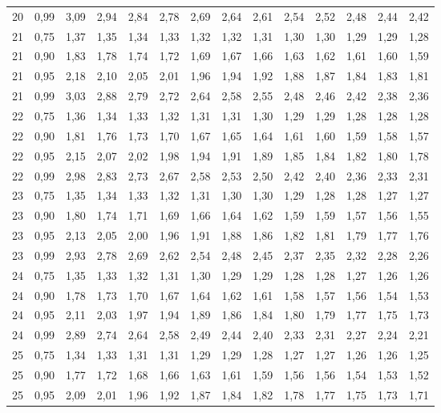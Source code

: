 \documentclass[
]{article}
\begin{document}
\begin{landscape}
\begin{longtable}[t]{cccccccccccccc}
20 & 0,99 & 3,09 & 2,94 & 2,84 & 2,78 & 2,69 & 2,64 & 2,61 & 2,54 & 2,52 & 2,48 & 2,44 & 2,42\\
21 & 0,75 & 1,37 & 1,35 & 1,34 & 1,33 & 1,32 & 1,32 & 1,31 & 1,30 & 1,30 & 1,29 & 1,29 & 1,28\\
21 & 0,90 & 1,83 & 1,78 & 1,74 & 1,72 & 1,69 & 1,67 & 1,66 & 1,63 & 1,62 & 1,61 & 1,60 & 1,59\\
21 & 0,95 & 2,18 & 2,10 & 2,05 & 2,01 & 1,96 & 1,94 & 1,92 & 1,88 & 1,87 & 1,84 & 1,83 & 1,81\\
21 & 0,99 & 3,03 & 2,88 & 2,79 & 2,72 & 2,64 & 2,58 & 2,55 & 2,48 & 2,46 & 2,42 & 2,38 & 2,36\\
22 & 0,75 & 1,36 & 1,34 & 1,33 & 1,32 & 1,31 & 1,31 & 1,30 & 1,29 & 1,29 & 1,28 & 1,28 & 1,28\\
22 & 0,90 & 1,81 & 1,76 & 1,73 & 1,70 & 1,67 & 1,65 & 1,64 & 1,61 & 1,60 & 1,59 & 1,58 & 1,57\\
22 & 0,95 & 2,15 & 2,07 & 2,02 & 1,98 & 1,94 & 1,91 & 1,89 & 1,85 & 1,84 & 1,82 & 1,80 & 1,78\\
22 & 0,99 & 2,98 & 2,83 & 2,73 & 2,67 & 2,58 & 2,53 & 2,50 & 2,42 & 2,40 & 2,36 & 2,33 & 2,31\\
23 & 0,75 & 1,35 & 1,34 & 1,33 & 1,32 & 1,31 & 1,30 & 1,30 & 1,29 & 1,28 & 1,28 & 1,27 & 1,27\\
23 & 0,90 & 1,80 & 1,74 & 1,71 & 1,69 & 1,66 & 1,64 & 1,62 & 1,59 & 1,59 & 1,57 & 1,56 & 1,55\\
23 & 0,95 & 2,13 & 2,05 & 2,00 & 1,96 & 1,91 & 1,88 & 1,86 & 1,82 & 1,81 & 1,79 & 1,77 & 1,76\\
23 & 0,99 & 2,93 & 2,78 & 2,69 & 2,62 & 2,54 & 2,48 & 2,45 & 2,37 & 2,35 & 2,32 & 2,28 & 2,26\\
24 & 0,75 & 1,35 & 1,33 & 1,32 & 1,31 & 1,30 & 1,29 & 1,29 & 1,28 & 1,28 & 1,27 & 1,26 & 1,26\\
24 & 0,90 & 1,78 & 1,73 & 1,70 & 1,67 & 1,64 & 1,62 & 1,61 & 1,58 & 1,57 & 1,56 & 1,54 & 1,53\\
24 & 0,95 & 2,11 & 2,03 & 1,97 & 1,94 & 1,89 & 1,86 & 1,84 & 1,80 & 1,79 & 1,77 & 1,75 & 1,73\\
24 & 0,99 & 2,89 & 2,74 & 2,64 & 2,58 & 2,49 & 2,44 & 2,40 & 2,33 & 2,31 & 2,27 & 2,24 & 2,21\\
25 & 0,75 & 1,34 & 1,33 & 1,31 & 1,31 & 1,29 & 1,29 & 1,28 & 1,27 & 1,27 & 1,26 & 1,26 & 1,25\\
25 & 0,90 & 1,77 & 1,72 & 1,68 & 1,66 & 1,63 & 1,61 & 1,59 & 1,56 & 1,56 & 1,54 & 1,53 & 1,52\\
25 & 0,95 & 2,09 & 2,01 & 1,96 & 1,92 & 1,87 & 1,84 & 1,82 & 1,78 & 1,77 & 1,75 & 1,73 & 1,71\\

\end{longtable}
\end{landscape}
\end{document}
